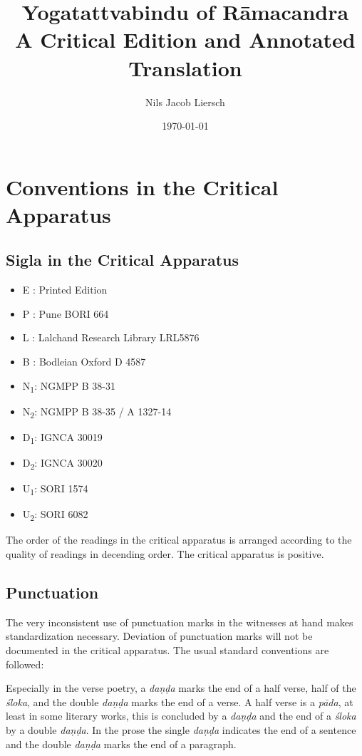 \documentclass[12pt]{article}%
\author{Nils Jacob Liersch}
\title{Yogatattvabindu of Rāmacandra\\ A Critical Edition and Annotated Translation}
\date{\today}
\def\acpc#1#2#3{{#1}\rlap{\textrm{\textsuperscript{#3}}}\textsubscript{\textrm{#2}}\space}
\def\sigl#1#2{{{#1}}\textsubscript{\textrm{#2}}}
\def\None{{\sigl{N}{1}}} \def\Noneac{\acpc{N}{1}{ac}\,} \def\Nonepc{\acpc{N}{1}{pc}\,}
\def\Ntwo{{\sigl{N}{2}}} \def\Noneac{\acpc{N}{2}{ac}\,} \def\Nonepc{\acpc{N}{2}{pc}\,}
\def\Done{{\sigl{D}{1}}} \def\Doneac{\acpc{D}{1}{ac}\,} \def\Donepc{\acpc{D}{1}{pc}\,}
\def\Dtwo{{\sigl{D}{2}}} \def\Dtwoac{\acpc{D}{2}{ac}\,} \def\Dtwopc{\acpc{D}{2}{pc}\,}
\def\Uone{{\sigl{U}{1}}} \def\Uoneac{\acpc{U}{1}{ac}\,} \def\Uonepc{\acpc{U}{1}{pc}\,}
\def\Utwo{{\sigl{U}{2}}} \def\Utwoac{\acpc{U}{2}{ac}\,} \def\Utwopc{\acpc{U}{2}{pc}\,}
\begin{document}
\maketitle
\clearpage

\section{Conventions in the Critical Apparatus}
\subsection{Sigla in the Critical Apparatus}

\begin{itemize}
\item E : Printed Edition
\item P : Pune BORI 664
\item L : Lalchand Research Library LRL5876
\item B : Bodleian Oxford D 4587
\item \None : NGMPP B 38-31
\item \Ntwo : NGMPP B 38-35 / A 1327-14
\item \Done : IGNCA 30019
\item \Dtwo : IGNCA 30020
\item \Uone : SORI 1574
\item \Utwo: SORI 6082
\end{itemize}

The order of the readings in the critical apparatus is arranged according to the quality of readings in decending order. The critical apparatus is positive. 

\subsection{Punctuation}

The very inconsistent use of punctuation marks in the witnesses at hand makes standardization necessary. Deviation of punctuation marks will not be documented in the critical apparatus. The usual standard conventions are followed:

Especially in the verse poetry, a \textit{daṇḍa} marks the end of a half verse, half of the \textit{śloka}, and the double \textit{daṇḍa} marks the end of a verse. A half verse is a \textit{pāda}, at least in some literary works, this is concluded by a \textit{daṇḍa} and the end of a \textit{śloka} by a double \textit{daṇḍa}. In the prose the single \textit{daṇḍa} indicates the end of a sentence and the double \textit{daṇḍa} marks the end of a paragraph.
\end{document}
